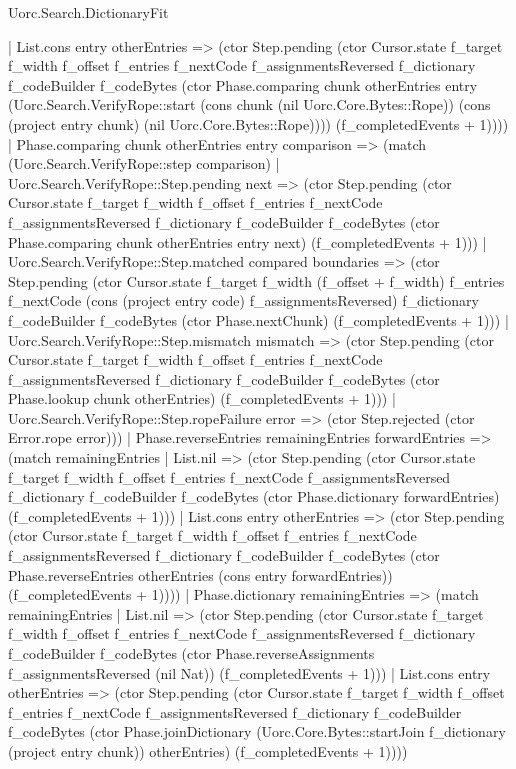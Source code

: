 \begin{lexlean}{Uorc.Search.DictionaryFit}
\begin{semanticmodule}
{        | List.cons entry otherEntries => (ctor Step.pending (ctor Cursor.state f_target f_width f_offset f_entries f_nextCode f_assignmentsReversed f_dictionary f_codeBuilder f_codeBytes (ctor Phase.comparing chunk otherEntries entry (Uorc.Search.VerifyRope::start (cons chunk (nil Uorc.Core.Bytes::Rope)) (cons (project entry chunk) (nil Uorc.Core.Bytes::Rope)))) (f_completedEvents + 1))))
      | Phase.comparing chunk otherEntries entry comparison => (match (Uorc.Search.VerifyRope::step comparison)
        | Uorc.Search.VerifyRope::Step.pending next => (ctor Step.pending (ctor Cursor.state f_target f_width f_offset f_entries f_nextCode f_assignmentsReversed f_dictionary f_codeBuilder f_codeBytes (ctor Phase.comparing chunk otherEntries entry next) (f_completedEvents + 1)))
        | Uorc.Search.VerifyRope::Step.matched compared boundaries => (ctor Step.pending (ctor Cursor.state f_target f_width (f_offset + f_width) f_entries f_nextCode (cons (project entry code) f_assignmentsReversed) f_dictionary f_codeBuilder f_codeBytes (ctor Phase.nextChunk) (f_completedEvents + 1)))
        | Uorc.Search.VerifyRope::Step.mismatch mismatch => (ctor Step.pending (ctor Cursor.state f_target f_width f_offset f_entries f_nextCode f_assignmentsReversed f_dictionary f_codeBuilder f_codeBytes (ctor Phase.lookup chunk otherEntries) (f_completedEvents + 1)))
        | Uorc.Search.VerifyRope::Step.ropeFailure error => (ctor Step.rejected (ctor Error.rope error)))
      | Phase.reverseEntries remainingEntries forwardEntries => (match remainingEntries
        | List.nil => (ctor Step.pending (ctor Cursor.state f_target f_width f_offset f_entries f_nextCode f_assignmentsReversed f_dictionary f_codeBuilder f_codeBytes (ctor Phase.dictionary forwardEntries) (f_completedEvents + 1)))
        | List.cons entry otherEntries => (ctor Step.pending (ctor Cursor.state f_target f_width f_offset f_entries f_nextCode f_assignmentsReversed f_dictionary f_codeBuilder f_codeBytes (ctor Phase.reverseEntries otherEntries (cons entry forwardEntries)) (f_completedEvents + 1))))
      | Phase.dictionary remainingEntries => (match remainingEntries
        | List.nil => (ctor Step.pending (ctor Cursor.state f_target f_width f_offset f_entries f_nextCode f_assignmentsReversed f_dictionary f_codeBuilder f_codeBytes (ctor Phase.reverseAssignments f_assignmentsReversed (nil Nat)) (f_completedEvents + 1)))
        | List.cons entry otherEntries => (ctor Step.pending (ctor Cursor.state f_target f_width f_offset f_entries f_nextCode f_assignmentsReversed f_dictionary f_codeBuilder f_codeBytes (ctor Phase.joinDictionary (Uorc.Core.Bytes::startJoin f_dictionary (project entry chunk)) otherEntries) (f_completedEvents + 1))))
}
\end{semanticmodule}
\end{lexlean}
